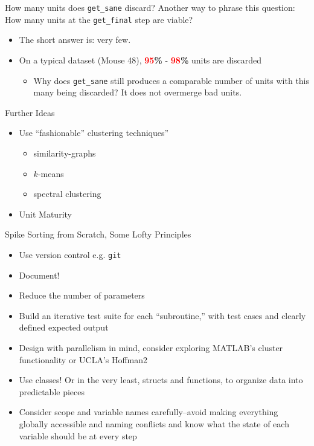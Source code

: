 \documentclass[11pt,handout]{beamer}
\begin{document}
    \begin{frame}{How many units does \texttt{get\_sane} discard?}
        Another way to phrase this question: How many units at the 
\texttt{get\_final} step are viable?
        \pause
        \begin{itemize}
        \item The short answer is: very few.
        \pause
        \item On a typical dataset (Mouse 48),
\textbf{\textcolor{red}{95}\%} - \textbf{\textcolor{red}{98}\%} units are
discarded
        \begin{itemize}
            \item Why does \texttt{get\_sane} still produces a comparable number
of units with this many being discarded? It does not overmerge bad units.
        \end{itemize} 
        \end{itemize}
    \end{frame}
 

    \begin{frame}{Further Ideas}
    \begin{itemize}
        \pause
        \item Use ``fashionable'' clustering techniques''
        \begin{itemize}
            \item similarity-graphs
            \item \ensuremath{k}-means
            \item spectral clustering
        \end{itemize}
        \pause
        \item Unit Maturity
    \end{itemize}
    \end{frame}
    
       
    \begin{frame}{Spike Sorting from Scratch, Some Lofty Principles}
        \begin{itemize}
            \pause 
            \item Use version control e.g. \texttt{git}
            \pause
            \item Document!
            \pause
            \item Reduce the number of parameters
            \pause
            \item Build an iterative test suite for each ``subroutine,'' with
test cases and clearly defined expected output
            \pause
            \item Design with parallelism in mind, consider exploring MATLAB's
cluster functionality or UCLA's Hoffman2
            \pause
            \item  Use classes! Or in the very least, structs and functions, to organize data
into predictable pieces
            \pause
            \item Consider scope and variable names carefully--avoid making
everything globally accessible and naming conflicts and know what the state of
each variable should be at every step
        \end{itemize}
    \end{frame}
\end{document}
